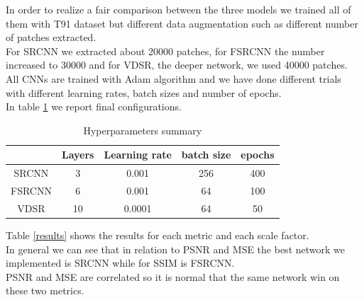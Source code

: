 \documentclass[10pt,twocolumn,letterpaper]{article}
\begin{document}
In order to realize a fair comparison between the three models we trained all of them with T91 dataset but different data augmentation such as different number of patches extracted.\\
For SRCNN we extracted about 20000 patches, for FSRCNN the number increased to 30000 and for VDSR, the deeper network, we used 40000 patches.\\
All CNNs are trained with  Adam algorithm \cite{kingma2014adam} and we have done different trials with different learning rates, batch sizes and number of epochs.\\
In table \ref{param} we report final configurations.
\begin{table}[h!]
\begin{center}
	\begin{tabular}{|c| c| c| c| c|} 
		
		\hline
		& Layers & Learning rate & batch size & epochs \\ 
		\hline
		SRCNN & 3 & 0.001 & 256 & 400 \\
		\hline
		FSRCNN & 6 & 0.001 & 64 & 100\\
		\hline
		VDSR & 10 & 0.0001 & 64 & 50\\
		\hline
	\end{tabular}
\label{param}
\end{center}
\caption{Hyperparameters summary}
\end{table}

Table \ref{results} shows the results for each metric and each scale factor.\\
 In general we can see that in relation to PSNR and MSE the best network we implemented is SRCNN while for SSIM is FSRCNN.\\
 PSNR and MSE are correlated so it is normal that the same network win on these two metrics.
 
 
\end{document}
